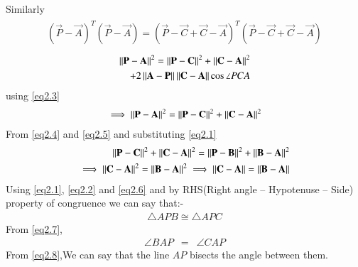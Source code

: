 \documentclass[journal,12pt,twocolumn]{IEEEtran}
\begin{document}
Similarly
\begin{align}
 \begin{split}
(\vec{P}-\vec{A})^T(\vec{P}-\vec{A})=(\vec{P}-\vec{C}+\vec{C}-\vec{A})^T(\vec{P}-\vec{C}+\vec{C}-\vec{A})
\end{split}
\end{align}
\begin{align}
 \begin{split}
\left\lVert\mathbf{P-A}\right\rVert^2=\left\lVert\mathbf{P-C}\right\rVert^2+\left\lVert\mathbf{C-A}\right\rVert^2\\ 
+2\left\lVert\mathbf{A}-\mathbf{P}\right\rVert\left\lVert\mathbf{C}-\mathbf{A}\right\rVert\cos\angle PCA \\
\end{split}
\end{align}
using \eqref{eq2.3}
\begin{align}
 \begin{split}
 \implies \left\lVert\mathbf{P-A}\right\rVert^2=\left\lVert\mathbf{P-C}\right\rVert^2+\left\lVert\mathbf{C-A}\right\rVert^2 \label{eq2.5}
 \end{split}
\end{align}
From \eqref{eq2.4} and \eqref{eq2.5} and substituting \eqref{eq2.1}
\begin{align}
\left\lVert\mathbf{P-C}\right\rVert^2+\left\lVert\mathbf{C-A}\right\rVert^2=\left\lVert\mathbf{P-B}\right\rVert^2+\left\lVert\mathbf{B-A}\right\rVert^2 \\
\implies \left\lVert\mathbf{C-A}\right\rVert^2=\left\lVert\mathbf{B-A}\right\rVert^2
\implies \left\lVert\mathbf{C-A}\right\rVert=\left\lVert\mathbf{B-A}\right\rVert \label{eq2.6}
\end{align}
Using \eqref{eq2.1}, \eqref{eq2.2} and \eqref{eq2.6} and by RHS(Right angle – Hypotenuse – Side) property of congruence we can say that:-\\
\begin{align}
\triangle APB \cong \triangle APC \label{eq2.7}
\end{align}
From \eqref{eq2.7},
\begin{align}
\angle BAP \enspace = \enspace \angle CAP \label{eq2.8}
\end{align}
From \eqref{eq2.8},We can say that the line $AP$ bisects the angle between them.
\end{document}
